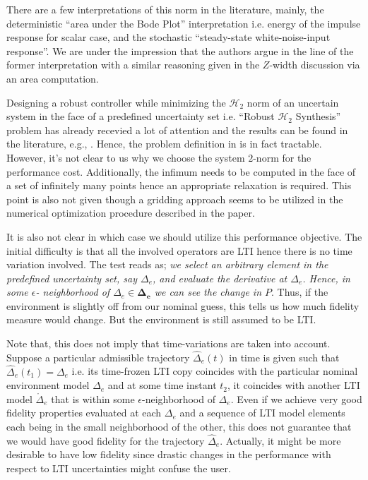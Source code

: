 There are a few interpretations of this norm in the literature, mainly, the deterministic \enquote{area under the Bode
Plot} interpretation i.e. energy of the impulse response for scalar case, and the stochastic \enquote{steady-state 
white-noise-input response}. We are under the impression that the authors argue in the line of the former interpretation
with a similar reasoning given in the $Z$-width discussion via an area computation. 


Designing a robust controller while minimizing the $\mathcal{H}_2$ norm of an uncertain system in the face of a predefined 
uncertainty set i.e. \enquote{Robust $\mathcal{H}_2$ Synthesis} problem has already recevied a lot of attention and 
the results can be found in the literature, e.g., \cite{dullerud}. Hence, the problem definition in \cite{cavusoglu} is 
in fact tractable. However, it's not clear to us why we choose the system $2$-norm for the performance cost. Additionally, 
the infimum needs to be computed in the face of a set of infinitely many points hence an appropriate relaxation is required. 
This point is also not given though a gridding approach seems to be utilized in the numerical optimization procedure 
described in the paper.

It is also not clear in which case we should utilize this performance objective. The initial difficulty is that all the 
involved operators are LTI hence there is no time variation involved. The test reads as; \emph{we select an arbitrary element 
in the predefined uncertainty set, say $\Delta_e$, and evaluate the derivative at $\Delta_e$. Hence, in some $\epsilon$-
neighborhood of $\Delta_e\in\bm{\Delta_e}$ we can see the change in $P$}. Thus, if the environment is slightly off from our 
nominal guess, this tells us how much fidelity measure would change. But the environment is still assumed to be LTI.


Note that, this does not imply that time-variations are taken into account. Suppose a particular admissible trajectory
$\hat{\Delta}_e(t)$ in time is given such that $\hat{\Delta}_e(t_1)=\Delta_e$ i.e. its time-frozen LTI copy coincides 
with the particular nominal environment model $\Delta_e$ and at some time instant $t_2$, it  coincides with another 
LTI model $\mathring\Delta_e$ that is within some $\epsilon$-neighborhood of $\Delta_e$. Even if we achieve very good 
fidelity properties evaluated at each $\Delta_e$ and a sequence of LTI model elements each being in the small neighborhood 
of the other, this does not guarantee that we would have good fidelity for the trajectory $\hat{\Delta}_e$. Actually, 
it might be more desirable to have low fidelity since drastic changes in the performance with respect to LTI uncertainties
might confuse the user.


